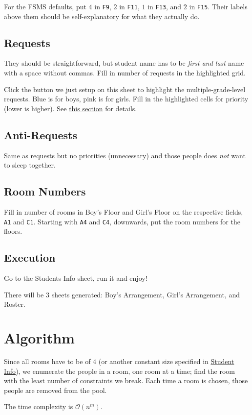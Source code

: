 \documentclass[openany,notitlepage]{book}
\begin{document}
	For the FSMS defaults, put $4$ in \verb|F9|, $2$ in \verb|F11|, $1$ in \verb|F13|, and $2$ in \verb|F15|. Their labels above them
	should be self-explanatory for what they actually do.
	\subsection{Requests}
	They should be straightforward, but student name has to be \emph{first and last} name with a space without commas. Fill
	in number of requests in the highlighted grid.
	
	Click the button we just setup on this sheet to highlight the multiple-grade-level requests. Blue is for boys, pink is for
	girls. Fill in the highlighted cells for priority (lower is higher). See \hyperref[intergrade]{this section} for details.
	\subsection{Anti-Requests}\label{anti}
	Same as requests but no priorities (unnecessary) and those people does \emph{not} want to sleep together.
	\subsection{Room Numbers}
	Fill in number of rooms in Boy's Floor and Girl's Floor on the respective fields, \verb|A1| and \verb|C1|. Starting with
	\verb|A4| and \verb|C4|, downwards, put the room numbers for the floors.
	\subsection{Execution}
	Go to the Students Info sheet, run it and enjoy!
	
	There will be $3$ sheets generated: Boy's Arrangement, Girl's Arrangement, and Roster.
	\section{Algorithm}\label{Algorithm}
	Since all rooms have to be of $4$ (or another constant size specified in \hyperref[inf]{Student Info}), we enumerate the people in a room, one room at a time;
	find the room with the least number of constraints we break. Each time a room is chosen, those people are removed
	from the pool.
	
	The time complexity is $\mathcal{O}(n^m)$.
	
\end{document}
